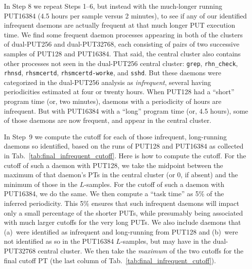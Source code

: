 \documentclass[letter]{ieice}
\begin{document}
{In Step 8 we repeat Steps 1--6, but instead with the much-longer running
PUT16384 (4.5 hours per \hbox{sample} versus 2 minutes), to see 
if any of our identified \hbox{infrequent} daemons are actually frequent 
at that much longer PUT execution time. 
We find some frequent daemon processes appearing in both of the 
clusters of \hbox{dual-PUT256} and \hbox{dual-PUT32768}, each consisting of 
pairs of two successive samples of PUT128 and PUT16384.
That said, the central cluster also contains other
  processes not seen in the \hbox{dual-PUT256} central cluster: 
  {\tt grep}, {\tt rhn\_check}, {\tt rhnsd}, {\tt rhsmcertd}, 
  {\tt rhsmcertd-worke}, and {\tt sshd}. 
  But these daemons were categorized in the \hbox{dual-PUT256} analysis as {\em
  infrequent}, several having \hbox{periodicities} estimated at four or twenty hours.
When PUT128 had a ``short'' 
program time (or, two minutes), daemons with a periodicity of
hours are \hbox{infrequent}. But with PUT16384 
with a ``long'' program time (or, 4.5 hours),
some of those daemons are now frequent, and appear in the central cluster.

In Step~9 we compute 
the cutoff for each of those infrequent, long-running daemons so
identified, based on the runs of PUT128 and 
PUT16384 as collected in Tab.~\ref{tab:final_infrequent_cutoff}. 
Here is how to compute the cutoff. For the cutoff of such a daemon with PUT128, 
we take the \hbox{midpoint} between the maximum of that daemon's PTs in the 
central cluster (or 0, if absent) and the \hbox{minimum} of those in the $L$-samples. 
For the cutoff of such a daemon with PUT16384, we do the same. 
We then compute a ``task time'' as 5\% of the inferred periodicity. 
This 5\% ensures that such infrequent daemons will impact 
only a small percentage of the shorter PUTs, while presumably being 
associated with much larger cutoffs for the very long PUTs. 
We also include daemons that (a)~were identified as infrequent and 
\hbox{long-running} from PUT128 and (b)~were not identified as so in the PUT16384 
\hbox{$L$-samples}, but may have in the \hbox{dual-PUT32768} central cluster.
We then take the {\em maximum} of the two cutoffs for the final cutoff PT 
(the last column of Tab.~\ref{tab:final_infrequent_cutoff}). 
}
\end{document}
